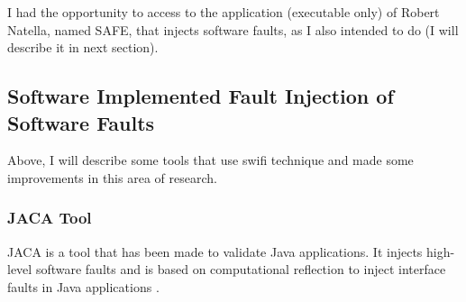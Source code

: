 


I had the opportunity to access to the application (executable only)
of Robert Natella, named SAFE, that injects software faults, as I also intended to do (I will describe it in next section).

\clearpage
\subsection{Software Implemented Fault Injection of Software Faults}

Above, I will describe some tools that use \ac{swifi} technique and made some improvements in this area of research.




\subsubsection{JACA Tool}
\hypertarget{JACA Tool}{}

JACA\cite{regina2003jaca} is a tool that has been made to validate Java applications. It injects high-level software faults and is based on computational reflection to inject interface faults in Java applications
\cite{martins2002jaca}. \\

